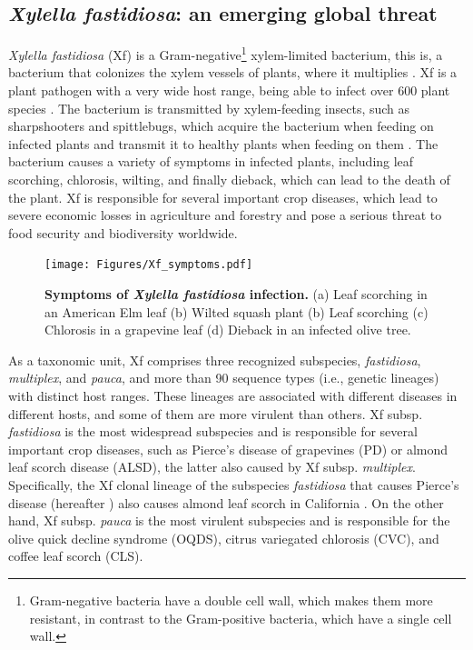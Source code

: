 \subsection{\label{sec:Xylella fastidiosa: an emerging global
    threat}\textit{Xylella
    fastidiosa}: an emerging global threat}

\textit{Xylella fastidiosa} (Xf) is a Gram-negative\footnote{Gram-negative
  bacteria have a double cell wall, which makes them more resistant, in
  contrast to the Gram-positive bacteria, which have a single cell wall.}
xylem-limited bacterium, this is, a bacterium that colonizes the xylem
vessels
of plants, where it multiplies \cite{Wells1987}. Xf is a plant pathogen with
a
very wide host range, being able to infect over 600 plant species
\cite{Delbianco2019}. The bacterium is transmitted by xylem-feeding insects,
such as sharpshooters and spittlebugs, which acquire the bacterium when
feeding
on infected plants and transmit it to healthy plants when feeding on them
\cite{Redak2004, Cornara2018}. The bacterium causes a variety of
symptoms in infected plants, including leaf scorching, chlorosis, wilting,
and
finally dieback, which can lead to the death of the plant. Xf is responsible
for several important crop diseases, which lead to severe economic losses in
agriculture and forestry and pose a serious threat to food security and
biodiversity worldwide.

\begin{figure}[H]
  \centering
  \texttt{[image: Figures/Xf\_symptoms.pdf]}
  \caption[Symptoms of \textit{Xylella fastidiosa} infection]{
    \textbf{Symptoms of \textit{Xylella fastidiosa} infection.} (a) Leaf
    scorching in an American Elm leaf (b) Wilted squash plant (b) Leaf
    scorching (c) Chlorosis in a grapevine leaf (d) Dieback in an infected
    olive tree.}
  \label{fig:Xylella}
\end{figure}

As a taxonomic unit, Xf comprises three recognized subspecies,
\textit{fastidiosa}, \textit{multiplex}, and \textit{pauca}, and more than 90
sequence types (i.e., genetic lineages) with distinct host ranges.
These lineages are associated with different diseases in different hosts, and
some of them are more virulent than others. Xf subsp. \textit{fastidiosa} is
the most widespread subspecies and is responsible for several important crop
diseases, such as Pierce's disease of grapevines (PD) or almond leaf scorch
disease (ALSD), the latter also caused by Xf subsp. \textit{multiplex}.
Specifically, the Xf clonal lineage of the subspecies \textit{fastidiosa}
that causes Pierce's disease (hereafter \xf) also causes almond leaf scorch
in
California \cite{Almeida2003}. On the other hand, Xf subsp.
\textit{pauca} is the most virulent subspecies and is responsible for the
olive
quick decline syndrome (OQDS), citrus variegated chlorosis (CVC), and coffee
leaf scorch (CLS).

